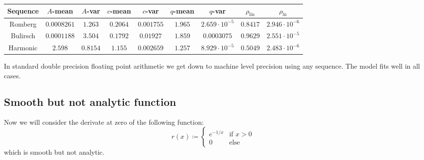 \begin{table}[H]
    \centering
    \small
    \begin{tabular}{c||c|c|c|c|c|c|c|c}
Sequence & \(A\)-mean & \(A\)-var & \(c\)-mean & \(c\)-var & \(q\)-mean & \(q\)-var & \(\rho_{\operatorname{lin}}\) & \(\rho_{\ln}\)\\\hline
\rowcolor{green}
Romberg & \(0.0008261\) & \(1.263\) & \(0.2064\) & \(0.001755\) & \(1.965\) & \(2.659\cdot 10^{-5}\) & \(0.8417\) & \(2.946\cdot 10^{-6}\) \\
\rowcolor{green}
Bulirsch & \(0.0001188\) & \(3.504\) & \(0.1792\) & \(0.01927\) & \(1.859\) & \(0.0003075\) & \(0.9629\) & \(2.551 \cdot 10^{-5}\) \\
\rowcolor{red}
Harmonic & \(2.598\) & \(0.8154\) & \(1.155\) & \(0.002659\) & \(1.257\) & \(8.929\cdot 10^{-5}\) & \(0.5049\) & \(2.483 \cdot 10^{-6}\) \\
    \end{tabular}
    \label{tab:my_label}
\end{table}

In standard double precision floating point arithmetic we get down to machine level precision using any sequence. The model fits well in all cases.

\subsection{Smooth but not analytic function}

Now we will consider the derivate at zero of the following function:
\[
r(x) \coloneqq \begin{cases}
e^{-1/x} & \text{if } x > 0\\
0 & \text{else}
\end{cases}
\]
which is smooth but not analytic.

